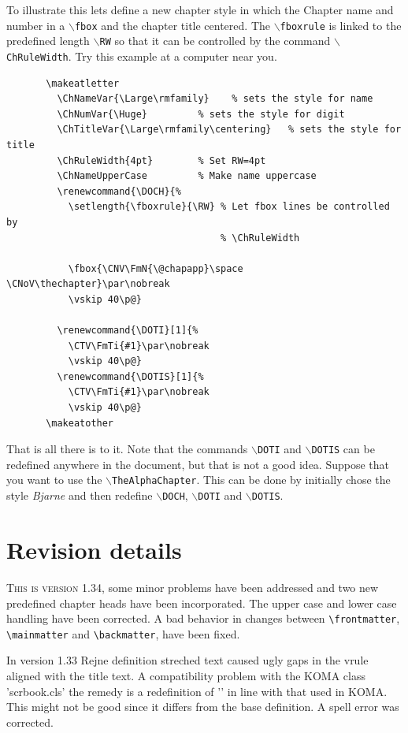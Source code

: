 \documentclass{report}
\newcommand{\A}[1]{{$\backslash$\texttt{#1}}}
\begin{document}
    To illustrate this lets define a new chapter style in which the
    Chapter name and number in a \A{fbox} and the chapter title
    centered. The \A{fboxrule} is linked to the predefined length
    \A{RW} so that it can be controlled by the command
    \A{ChRuleWidth}. Try this example at a computer near you.
    \begin{verbatim}
       \makeatletter
         \ChNameVar{\Large\rmfamily}    % sets the style for name
         \ChNumVar{\Huge}         % sets the style for digit
         \ChTitleVar{\Large\rmfamily\centering}   % sets the style for title
         \ChRuleWidth{4pt}        % Set RW=4pt
         \ChNameUpperCase         % Make name uppercase
         \renewcommand{\DOCH}{%
           \setlength{\fboxrule}{\RW} % Let fbox lines be controlled by
                                      % \ChRuleWidth

           \fbox{\CNV\FmN{\@chapapp}\space \CNoV\thechapter}\par\nobreak
           \vskip 40\p@}

         \renewcommand{\DOTI}[1]{%
           \CTV\FmTi{#1}\par\nobreak
           \vskip 40\p@}
         \renewcommand{\DOTIS}[1]{%
           \CTV\FmTi{#1}\par\nobreak
           \vskip 40\p@}
       \makeatother
    \end{verbatim}
    That is all there is to it. Note that the commands \A{DOTI} and
    \A{DOTIS} can be redefined anywhere in the document, but that is
    not a good idea. Suppose that you want to use the
    \A{TheAlphaChapter}. This can be done by initially chose the style
    {\em Bjarne}\/ and then redefine \A{DOCH}, \A{DOTI} and \A{DOTIS}.
    \chapter{Revision details}
     \lettrine{T}{his is version 1.34}, some minor problems have been
     addressed and two new predefined chapter heads have been
     incorporated. The upper case and lower case handling have been
     corrected. A bad behavior in changes between \verb+\frontmatter+,
     \verb+\mainmatter+ and  \verb+\backmatter+, have been fixed.   

     In version 1.33 Rejne definition streched text caused ugly gaps
     in the vrule aligned with the title text. A compatibility problem
     with the KOMA class 'scrbook.cls' the remedy is a redefinition of
     '\@schapter' in line with that used in KOMA. This might not be
     good since it differs from the base definition. A spell error was
     corrected.
 
\end{document}
